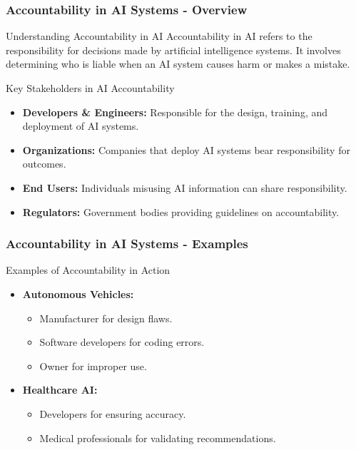 \documentclass[aspectratio=169]{beamer}
\begin{document}
\begin{frame}[fragile]
    \frametitle{Accountability in AI Systems - Overview}
    \begin{block}{Understanding Accountability in AI}
        Accountability in AI refers to the responsibility for decisions made by artificial intelligence systems. It involves determining who is liable when an AI system causes harm or makes a mistake.
    \end{block}
    
    \begin{block}{Key Stakeholders in AI Accountability}
        \begin{itemize}
            \item \textbf{Developers \& Engineers:} Responsible for the design, training, and deployment of AI systems.
            \item \textbf{Organizations:} Companies that deploy AI systems bear responsibility for outcomes.
            \item \textbf{End Users:} Individuals misusing AI information can share responsibility.
            \item \textbf{Regulators:} Government bodies providing guidelines on accountability.
        \end{itemize}
    \end{block}
\end{frame}

\begin{frame}[fragile]
    \frametitle{Accountability in AI Systems - Examples}
    \begin{block}{Examples of Accountability in Action}
        \begin{itemize}
            \item \textbf{Autonomous Vehicles:} 
            \begin{itemize}
                \item Manufacturer for design flaws.
                \item Software developers for coding errors.
                \item Owner for improper use.
            \end{itemize}
            \item \textbf{Healthcare AI:} 
            \begin{itemize}
                \item Developers for ensuring accuracy.
                \item Medical professionals for validating recommendations.
            \end{itemize}
        \end{itemize}
    \end{block}
\end{frame}
\end{document}
